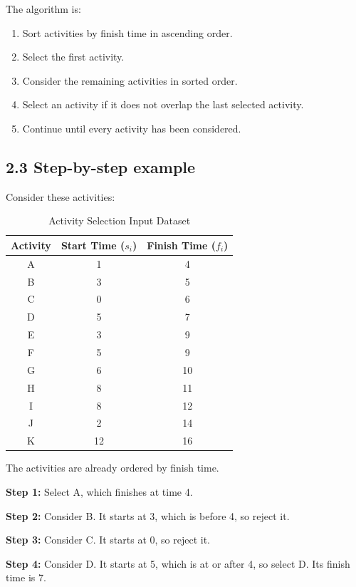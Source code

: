 The algorithm is:

\begin{enumerate}
    \item Sort activities by finish time in ascending order.
    \item Select the first activity.
    \item Consider the remaining activities in sorted order.
    \item Select an activity if it does not overlap the last selected activity.
    \item Continue until every activity has been considered.
\end{enumerate}

\subsection{2.3 Step-by-step example}

Consider these activities:

\begin{table}[htbp]
\centering
\caption{Activity Selection Input Dataset}
\label{tab:activity_selection_data}
\begin{tabular}{ccc}
\toprule
\textbf{Activity} & \textbf{Start Time ($s_i$)} & \textbf{Finish Time ($f_i$)} \\
\midrule
A & 1 & 4 \\
B & 3 & 5 \\
C & 0 & 6 \\
D & 5 & 7 \\
E & 3 & 9 \\
F & 5 & 9 \\
G & 6 & 10 \\
H & 8 & 11 \\
I & 8 & 12 \\
J & 2 & 14 \\
K & 12 & 16 \\
\bottomrule
\end{tabular}
\end{table}

The activities are already ordered by finish time.

\textbf{Step 1:} Select A, which finishes at time 4.

\textbf{Step 2:} Consider B. It starts at 3, which is before 4, so reject it.

\textbf{Step 3:} Consider C. It starts at 0, so reject it.

\textbf{Step 4:} Consider D. It starts at 5, which is at or after 4, so select D. Its finish time is 7.

